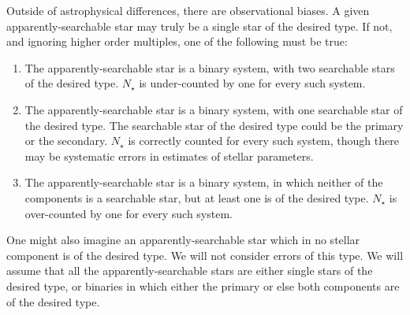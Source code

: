 \documentclass{emulateapj}
\begin{document}
Outside of astrophysical differences, there are observational biases.
A given apparently-searchable star may truly be a single star of the desired 
type. If not, and ignoring higher order multiples, one of the following must 
be true:
\begin{enumerate}	
\item The apparently-searchable star is a binary system, with two searchable 
stars of the desired type. $N_\star$ is under-counted by one for every such 
system.
%
\item The apparently-searchable star is a binary system, with one searchable 
star of the desired type. 
The searchable star of the desired type could be the primary or the secondary.
$N_\star$ is correctly counted for every such system, though there may be 
systematic errors in estimates of stellar parameters.
%
\item  The apparently-searchable star is a binary system, in which neither of 
the components is a searchable star, but at least one is of the desired type. 
$N_\star$ is over-counted by one for every such system.
\end{enumerate}

One might also imagine an apparently-searchable star which in no stellar 
component is of the desired type.
We will not consider errors of this type.  We will assume that all the 
apparently-searchable stars are either single stars of
the desired type, or binaries in which either the primary or else both 
components are of the desired type.
\end{document}
